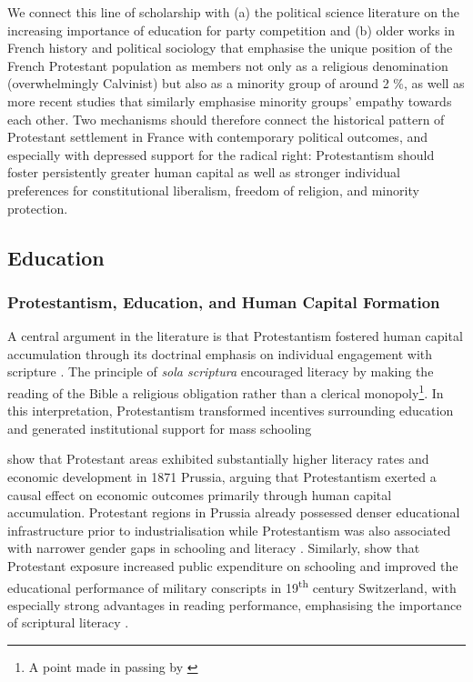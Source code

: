 \documentclass[12pt]{article}
\begin{document}
We connect this line of scholarship with (a) the political science literature on the increasing importance of education for party competition and (b) older works in French history and political sociology that emphasise the unique position of the French Protestant population as members not only as a religious denomination (overwhelmingly Calvinist) but also as a minority group of around 2 \%, as well as more recent studies that similarly emphasise minority groups' empathy towards each other. Two mechanisms should therefore connect the historical pattern of Protestant settlement in France with contemporary political outcomes, and especially with depressed support for the radical right: Protestantism should foster persistently greater human capital as well as stronger individual preferences for constitutional liberalism, freedom of religion, and minority protection.

\subsection{Education}

\subsubsection{Protestantism, Education, and Human Capital Formation}

A central argument in the literature is that Protestantism fostered human capital accumulation through its doctrinal emphasis on individual engagement with scripture \parencite{eire2016reformations, mokyr2017culture}. The principle of \textit{sola scriptura} encouraged literacy by making the reading of the Bible a religious obligation rather than a clerical monopoly\footnote{A point made in passing by \textcite[p. 151]{stinchcombeSocialStructureOrganizations1965}}. In this interpretation, Protestantism transformed incentives surrounding education and generated institutional support for mass schooling \parencite{straussTechniques1981, paulsen1885geschichte, stone1964educational}

\textcite{beckerWasWeberWrong2009} show that Protestant areas exhibited substantially higher literacy rates and economic development in 1871 Prussia, arguing that Protestantism exerted a causal effect on economic outcomes primarily through human capital accumulation. Protestant regions in Prussia already possessed denser educational infrastructure prior to industrialisation \parencite{beckerEffectProtestantismEducation2010} while Protestantism was also associated with narrower gender gaps in schooling and literacy \parencite{beckerLutherGirlsReligious2008}. Similarly, \textcite{boppartWhichConditionsDoes2013} show that Protestant exposure increased public expenditure on schooling and improved the educational performance of military conscripts in 19\textsuperscript{th} century Switzerland, with especially strong advantages in reading performance, emphasising the importance of scriptural literacy \parencite{boppartPROTESTANTISMEDUCATIONREADING2014}. 
\end{document}
